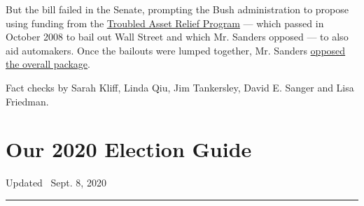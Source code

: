 But the bill failed in the Senate, prompting the Bush administration to
propose using funding from the
\href{https://www.treasury.gov/initiatives/financial-stability/reports/Pages/TARP-Tracker.aspx}{Troubled
Asset Relief Program} --- which passed in October 2008 to bail out Wall
Street and which Mr. Sanders opposed --- to also aid automakers. Once
the bailouts were lumped together, Mr. Sanders
\href{https://www.senate.gov/legislative/LIS/roll_call_lists/roll_call_vote_cfm.cfm?congress=111\&session=1\&vote=00005}{opposed
the overall package}.

Fact checks by Sarah Kliff, Linda Qiu, Jim Tankersley, David E. Sanger
and Lisa Friedman.

\hypertarget{our-2020-election-guide}{%
\section{Our 2020 Election Guide}\label{our-2020-election-guide}}

Updated ~Sept. 8, 2020

\begin{center}\rule{0.5\linewidth}{\linethickness}\end{center}

